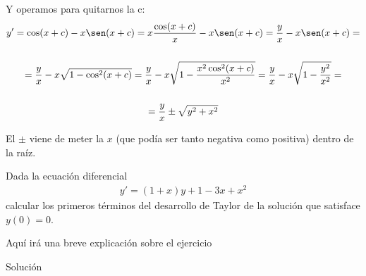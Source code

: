 \documentclass[nochap]{apuntes}
\begin{document}
\begin{problem}[6]
Y operamos para quitarnos la c:
\begin{gather*}
y'=\cos(x+c)-x\sen(x+c)=x\frac{\cos(x+c)}{x}-x\sen(x+c)=\frac{y}{x}-x\sen(x+c)=\\\\
=\frac{y}{x}-x\sqrt{1-\cos ^2(x+c)}=\frac{y}{x}-x\sqrt{1-\frac{x^2\cos^2(x+c)}{x^2}}=\frac{y}{x}-x\sqrt{1-\frac{y^2}{x^2}}=\\\\
=\frac{y}{x}\pm\sqrt{y^2+x^2}
\end{gather*}
\begin{expla}
El $\pm$ viene de meter la $x$ (que podía ser tanto negativa como positiva) dentro de la raíz.
\end{expla}

\end{problem}
\newpage


\begin{problem}[7]
Dada la ecuación diferencial
\begin{gather*}
y'=(1+x)y+1-3x+x^2
\end{gather*}
calcular los primeros términos del desarrollo de Taylor de la solución que satisface $y(0) = 0$.

\solution

\begin{expla}
Aquí irá una breve explicación sobre el ejercicio
\end{expla}

Solución

\end{problem}
\end{document}
